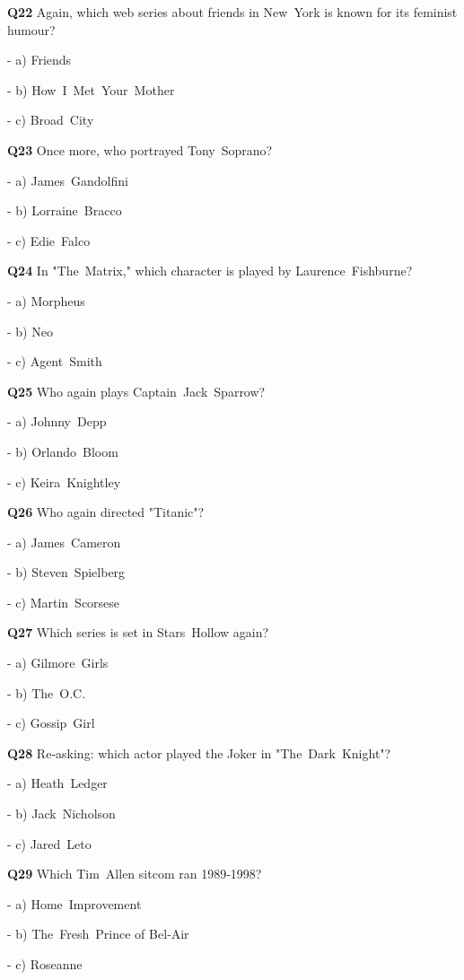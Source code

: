 \textbf{Q22} Again, which web series about friends in New York is known for its feminist humour?\par
\quad - a) Friends\par
\quad - b) How I Met Your Mother\par
\quad - c) Broad City\par

\textbf{Q23} Once more, who portrayed Tony Soprano?\par
\quad - a) James Gandolfini\par
\quad - b) Lorraine Bracco\par
\quad - c) Edie Falco\par

\textbf{Q24} In "The Matrix," which character is played by Laurence Fishburne?\par
\quad - a) Morpheus\par
\quad - b) Neo\par
\quad - c) Agent Smith\par

\textbf{Q25} Who again plays Captain Jack Sparrow?\par
\quad - a) Johnny Depp\par
\quad - b) Orlando Bloom\par
\quad - c) Keira Knightley\par

\textbf{Q26} Who again directed "Titanic"?\par
\quad - a) James Cameron\par
\quad - b) Steven Spielberg\par
\quad - c) Martin Scorsese\par

\textbf{Q27} Which series is set in Stars Hollow again?\par
\quad - a) Gilmore Girls\par
\quad - b) The O.C.\par
\quad - c) Gossip Girl\par

\textbf{Q28} Re‑asking: which actor played the Joker in "The Dark Knight"?\par
\quad - a) Heath Ledger\par
\quad - b) Jack Nicholson\par
\quad - c) Jared Leto\par

\textbf{Q29} Which Tim Allen sitcom ran 1989‑1998?\par
\quad - a) Home Improvement\par
\quad - b) The Fresh Prince of Bel‑Air\par
\quad - c) Roseanne\par

